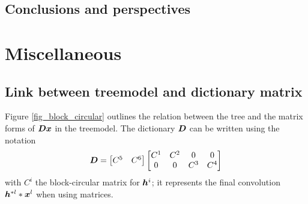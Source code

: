 \section{Conclusions and perspectives}



\clearpage
{}
\appendix

\chapter{Miscellaneous}


\section{Link between \gls{treemodel} and dictionary matrix}\label{sec_matrix_vs_tree} %

Figure \ref{fig_block_circular} outlines the relation between the tree and the matrix forms of $\bm{D}\bm{x}$ in the \gls{treemodel}. The dictionary $\bm{D}$ can be written using the notation
$$\bm{D} = \begin{bmatrix}C^5 & C^6\end{bmatrix} \begin{bmatrix}C^1 & C^2 & 0 & 0 \\0 & 0 & C^3 & C^4\end{bmatrix}$$
with $C^i$ the block-circular matrix for $\bm{h}^i$; it represents the final convolution $\bm{h}^{*l}*\bm{x}^l$ when using matrices.

